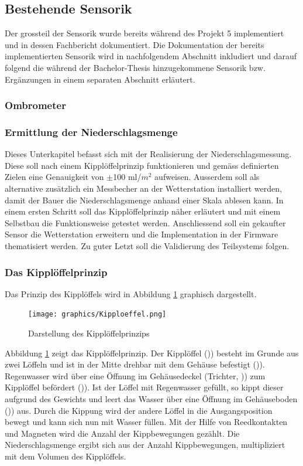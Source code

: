 \subsection{Bestehende Sensorik}
\label{subsec:Sensoren}
Der grossteil der Sensorik wurde bereits während des Projekt 5 implementiert und in dessen Fachbericht dokumentiert. Die Dokumentation der bereits implementierten Sensorik wird in nachfolgendem Abschnitt inkludiert und darauf folgend die während der Bachelor-Thesis hinzugekommene Sensorik bzw. Ergänzungen in einem separaten Abschnitt erläutert.

\subsubsection{Ombrometer}

\subsubsection*{\textbf{Ermittlung der Niederschlagsmenge}}
Dieses Unterkapitel befasst sich mit der Realisierung der Niederschlagsmessung. Diese soll nach einem Kipplöffelprinzip funktionieren und gemäss definierten Zielen eine Genauigkeit von $\pm$100 ml/$m^2$ aufweisen. Ausserdem soll als alternative zusätzlich ein Messbecher an der Wetterstation installiert werden, damit der Bauer die Niederschlagsmenge anhand einer Skala ablesen kann. In einem ersten Schritt soll das Kipplöffelprinzip näher erläutert und mit einem Selbstbau die Funktionsweise getestet werden. Anschliessend soll ein gekaufter Sensor die Wetterstation erweitern und die Implementation in der Firmware thematisiert werden. Zu guter Letzt soll die Validierung des Teilsystems folgen.
\subsubsection*{\textbf{Das Kipplöffelprinzip}}
Das Prinzip des Kipplöffels wird in Abbildung \ref{fig:Kipp} graphisch dargestellt.

\begin{figure}[h]
\centering
\texttt{[image: graphics/Kipploeffel.png]}
\caption{Darstellung des Kipplöffelprinzips}
\label{fig:Kipp}
\end{figure}

Abbildung \ref{fig:Kipp} zeigt das Kipplöffelprinzip. Der Kipplöffel ()\grqq) besteht im Grunde aus zwei Löffeln und ist in der Mitte drehbar mit dem Gehäuse befestigt ()\grqq). Regenwasser wird über eine Öffnung im Gehäusedeckel (Trichter, )\grqq) zum Kipplöffel befördert ()\grqq). Ist der Löffel mit Regenwasser gefüllt, so kippt dieser aufgrund des Gewichts und leert das Wasser über eine Öffnung im Gehäuseboden ()\grqq) aus. Durch die Kippung wird der andere Löffel in die Ausgangsposition bewegt und kann sich nun mit Wasser füllen. Mit der Hilfe von Reedkontakten und Magneten wird die Anzahl der Kippbewegungen gezählt. Die Niederschlagsmenge ergibt sich aus der Anzahl Kippbewegungen, multipliziert mit dem Volumen des Kipplöffels.
\newpage

